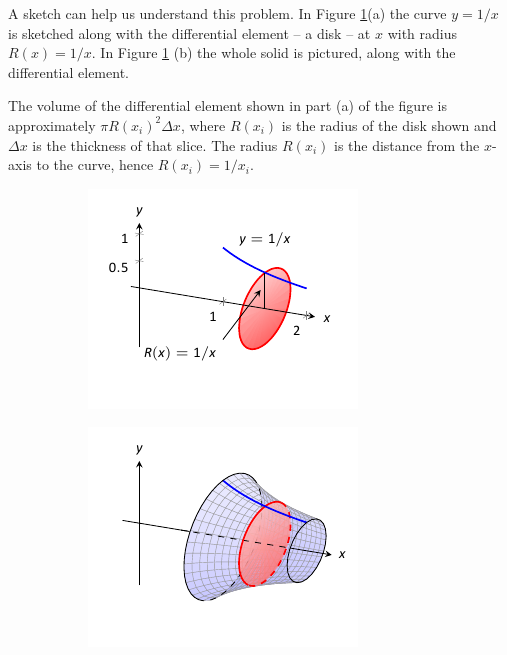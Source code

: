 %
\begin{solution}
{A sketch can help us understand this problem. In Figure \ref{fig:disk1}(a) the curve $y=1/x$ is sketched along with the differential element -- a disk -- at $x$ with radius $R(x)=1/x$. In Figure \ref{fig:disk1} (b) the whole solid is pictured, along with the differential element. 

The volume of the differential element shown in part (a) of the figure is approximately $\pi R(x_i)^2\Delta x$, where $R(x_i)$ is the radius of the disk shown and $\Delta x$ is the thickness of that slice. The radius $R(x_i)$ is the distance from the $x$-axis to the curve, hence $R(x_i) = 1/x_i$.
	



\begin{figure}
	\centering
	\begin{subfigure}[t]{0.5\textwidth}
		\includegraphics[width=\textwidth]{figures/figdisk1}
        \label{fig:disk1}
        \caption{} 
    \end{subfigure}%
    \begin{subfigure}[t]{0.5\textwidth}
    \includegraphics[width=\textwidth]{figures/figdisk1b}

\end{subfigure}
\end{figure}}
\end{solution}
